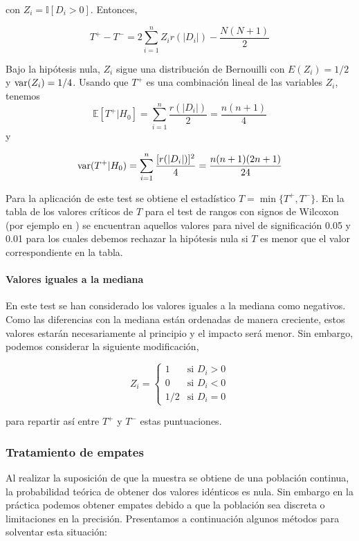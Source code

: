 	 con $ Z_i = \mathbb{I}[ D_i > 0 ]$. Entonces,
	 		
	\[ T^+  - T^- = 2 \sum\limits_{i=1}^n
					 Z_i r(|D_i|) - \frac{N(N+1)}{2} \]
	
	Bajo la hipótesis nula, $Z_i$ sigue una distribución de 
Bernouilli con $E(Z_i) = 1/2$ y $\text{var}(Z_i) = 1/4$. Usando que 
$T^+$ es una combinación lineal de las variables $Z_i$, 
tenemos
	\[ \mathbb{E}[ T^+ | H_0 ] = \sum\limits_{i=1}^n 
						\frac{r(|D_i|)}{2} 
					= \frac{n(n+1)}{4}			\]
	y
	
	\[ \text{var}( T^+ | H_0 ) = \sum\limits_{i=1}^n 
						\frac{[r(|D_i|)]^2}{4} 
					= \frac{n(n+1)(2n+1)}{24}	\]
					
	Para la aplicación de este test se obtiene el estadístico 
$T = \min \{ T^+, T^- \}$. En la tabla de los valores 
críticos de $T$ para el test de rangos con signos de Wilcoxon 
(por ejemplo en \cite[Tabla A5]{SHESKIN11}) se encuentran aquellos valores 
para nivel de significación 0.05 y 0.01 para los cuales 
debemos rechazar la hipótesis nula si $T$ es menor que el 
valor correspondiente en la tabla.\\
	
\paragraph{Valores iguales a la mediana} En este test se han 
considerado los valores iguales a la mediana como negativos. 
Como las diferencias con la mediana están ordenadas de manera 
creciente, estos valores estarán necesariamente al principio 
y el impacto será menor. Sin embargo, podemos considerar la 
siguiente modificación,

	\[ Z_i = \left\lbrace \begin{array}{ll}
	 				1 & \text{si } D_i > 0 \\
	 				0 & \text{si } D_i < 0 \\
	 				1/2 & \text{si } D_i = 0 
	 		\end{array} \right. 					\]
	
	para repartir así entre $T^+$ y $T^-$ estas puntuaciones. 
	
\subsubsection{Tratamiento de empates}
	
	Al realizar la suposición de que la muestra se obtiene de 
una población continua, la probabilidad teórica de obtener 
dos valores idénticos es nula. Sin embargo en la práctica 
podemos obtener empates debido a que la población sea 
discreta o limitaciones en la precisión. Presentamos a 
continuación algunos métodos para solventar esta situación:
	

